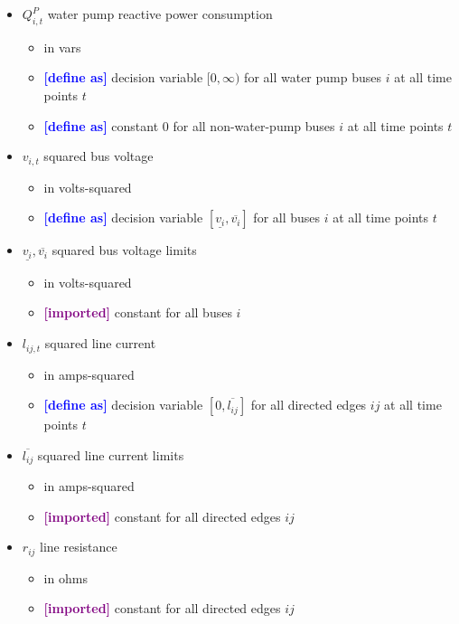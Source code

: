 \documentclass{article}
\newcommand{\lo}[1]{\underline{#1}}
\newcommand{\hi}[1]{\overline{#1}}
\newcommand{\define}{\textcolor{blue}{\textbf{[define as] }}}
\newcommand{\imported}{\textcolor{purple}{\textbf{[imported] }}}
\begin{document}
\begin{itemize}
\item $Q^P_{i,t}$ water pump reactive power consumption
  \begin{itemize}
  \item in vars
  \item \define decision variable $[0, \infty)$ for all water pump buses $i$ at
    all time points $t$
  \item \define constant $0$ for all non-water-pump buses $i$ at all time points
    $t$
  \end{itemize}

\item $v_{i,t}$ squared bus voltage
  \begin{itemize}
  \item in volts-squared
  \item \define decision variable $[\lo{v_i}, \hi{v_i}]$ for all buses $i$ at
    all time points $t$
  \end{itemize}

\item $\lo{v_{i}}, \hi{v_{i}}$ squared bus voltage limits
  \begin{itemize}
  \item in volts-squared
  \item \imported constant for all buses $i$
  \end{itemize}

\item $l_{ij,t}$ squared line current
  \begin{itemize}
  \item in amps-squared
  \item \define decision variable $[0, \hi{l_{ij}}]$ for all directed edges $ij$
    at all time points $t$
  \end{itemize}

\item $\hi{l_{ij}}$ squared line current limits
  \begin{itemize}
  \item in amps-squared
  \item \imported constant for all directed edges $ij$
  \end{itemize}

\item $r_{ij}$ line resistance
  \begin{itemize}
  \item in ohms
  \item \imported constant for all directed edges $ij$
  \end{itemize}


\end{itemize}
\end{document}

